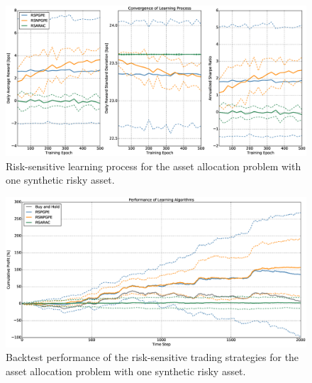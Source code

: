 \begin{figure}[b!]
	\centering
	\includegraphics[width=1.0\textwidth]{Images/6_4_single_synthetic_sensitive_convergence}
	\caption[Risk-sensitive learning process for one synthetic risky asset]{Risk-sensitive learning process for the asset allocation problem with one synthetic risky asset.}
	\label{fig:single_synthetic_sensitive_convergence}
\end{figure}

\begin{figure}[t!]
	\centering
	\includegraphics[width=1.0\textwidth]{Images/6_5_single_synthetic_sensitive_performance}
	\caption[Backtest performance with one synthetic risky asset]{Backtest performance of the risk-sensitive trading strategies for the asset allocation problem with one synthetic risky asset.}
	\label{fig:single_synthetic_sensitive_performance}
\end{figure}

